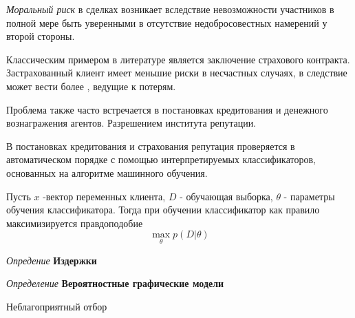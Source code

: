 \textit{Моральный  риск} в сделках возникает вследствие невозможности участников в полной мере быть уверенными в отсутствие недобросовестных намерений у второй стороны.

Классическим примером в литературе является заключение страхового контракта. Застрахованный клиент имеет меньшие риски в несчастных случаях, в следствие может вести более , ведущие к потерям.

Проблема также часто встречается в постановках кредитования и денежного вознагражения агентов. Разрешением института репутации. 

В постановках кредитования и страхования репутация проверяется в автоматическом порядке с помощью интерпретируемых классификаторов, основанных на алгоритме машинного обучения.

Пусть $x$ -вектор переменных клиента, $D$ - обучающая выборка,  $\theta$ -  параметры обучения классификатора. Тогда при обучении классификатор как правило максимизируется правдоподобие
$$
    \max_\theta  p(D|\theta) 
$$


\textit{Опредение} \textbf{Издержки}


\textit{Определение} \textbf{Вероятностные графические модели} 



Неблагоприятный отбор  \cite{akerlof1978market}